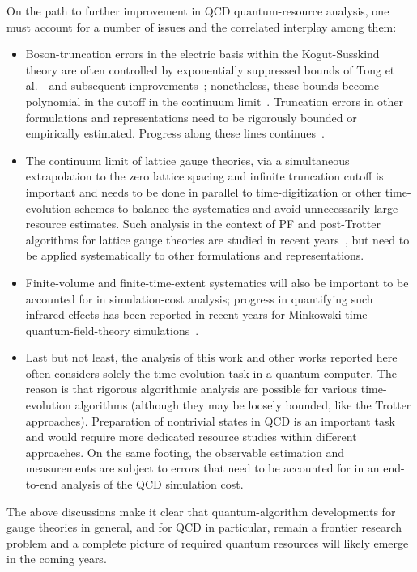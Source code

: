 \documentclass[aps,prd,twocolumn,showpacs,groupedaddress,superscriptaddress,nofootinbib,floatfix,preprintnumbers,longbibliography]{revtex4-1}
\begin{document}
On the path to further improvement in QCD quantum-resource analysis, one must account for a number of issues and the correlated interplay among them:
%
\begin{itemize}
  \item[$\diamond$] Boson-truncation errors in the electric basis within the Kogut-Susskind theory are often controlled by exponentially suppressed bounds of Tong et al.~\cite{Tong:2021rfv}~and subsequent improvements~\cite{Peng:2023bzl}; nonetheless, these bounds become polynomial in the cutoff in the continuum limit~\cite{Tong:2021rfv}. Truncation errors in other formulations and representations need to be rigorously bounded or empirically estimated. Progress along these lines continues~\cite{Yang:2026zpa,Ciavarella:2025tdl}.
  \item[$\diamond$] The continuum limit of lattice gauge theories, via a simultaneous extrapolation to the zero lattice spacing and infinite truncation cutoff is important and needs to be done in parallel to time-digitization or other time-evolution schemes to balance the systematics and avoid unnecessarily large resource estimates. Such analysis in the context of PF and post-Trotter algorithms for lattice gauge theories are studied in recent years~\cite{Carena:2021ltu,Kane:2025ybw,Carena:2022kpg,Ciavarella:2023mfc,Illa:2025njz}, but need to be applied systematically to other formulations and representations.
  \item[$\diamond$] Finite-volume and finite-time-extent systematics will also be important to be accounted for in simulation-cost analysis; progress in quantifying such infrared effects has been reported in recent years for Minkowski-time quantum-field-theory simulations~\cite{Briceno:2020rar,Burbano:2025pef}.
  \item[$\diamond$] Last but not least, the analysis of this work and other works reported here often considers solely the time-evolution task in a quantum computer. The reason is that rigorous algorithmic analysis are possible for various time-evolution algorithms (although they may be loosely bounded, like the Trotter approaches). Preparation of nontrivial states in QCD is an important task and would require more dedicated resource studies within different approaches. On the same footing, the observable estimation and measurements are subject to errors that need to be accounted for in an end-to-end analysis of the QCD simulation cost.
\end{itemize}
%

The above discussions make it clear that quantum-algorithm developments for gauge theories in general, and for QCD in particular, remain a frontier research problem and a complete picture of required quantum resources will likely emerge in the coming years.
\end{document}
